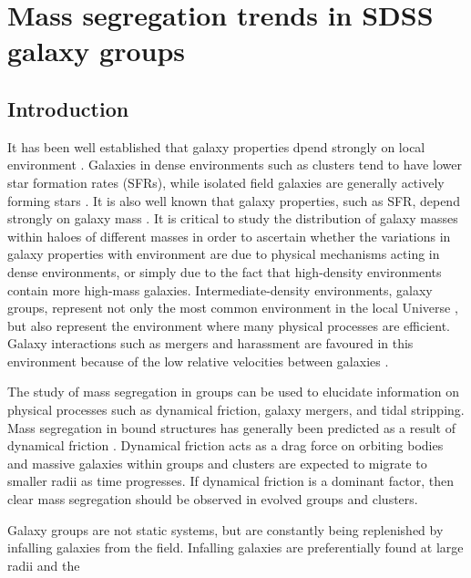 \chapter{Mass segregation trends in SDSS galaxy groups}
\label{chap:massSeg}

\section{Introduction}
\label{sec:intro_ms}

It has been well established that galaxy properties dpend strongly on
local environment \citep[e.g.][]{oemler1974, hogg2004, blanton2005b,
  tal2014}.  Galaxies in dense environments such as clusters tend to
have lower star formation rates (SFRs), while isolated field galaxies
are generally actively forming stars \citep[e.g.][]{balogh2000,
  ball2008, wetzel2012}.  It is also well known that galaxy
properties, such as SFR, depend strongly on galaxy mass
\citep[e.g.][]{poggianti2008}.  It is critical to study the
distribution of galaxy masses within haloes of different masses in
order to ascertain whether the variations in galaxy properties with
environment are due to physical mechanisms acting in dense
environments, or simply due to the fact that high-density environments
contain more high-mass galaxies.  Intermediate-density environments,
galaxy groups, represent not only the most common environment in the
local Universe \citep{geller1983, eke2005}, but also represent the
environment where many physical processes are efficient.  Galaxy
interactions such as mergers and harassment are favoured in this
environment because of the low relative velocities between galaxies
\citep{zabludoff1998, brough2006}.
\par
The study of mass segregation in groups can be used to elucidate
information on physical processes such as dynamical friction, galaxy
mergers, and tidal stripping.  Mass segregation in bound structures
has generally been predicted as a result of dynamical friction
\citep{chandrasekhar1943}.  Dynamical friction acts as a drag force on
orbiting bodies and massive galaxies within groups and clusters are
expected to migrate to smaller radii as time progresses.  If dynamical
friction is a dominant factor, then clear mass segregation should be
observed in evolved groups and clusters.
\par
Galaxy groups are not static systems, but are constantly being
replenished by infalling galaxies from the field.  Infalling galaxies
are preferentially found at large radii \citep{wetzel2013} and the
